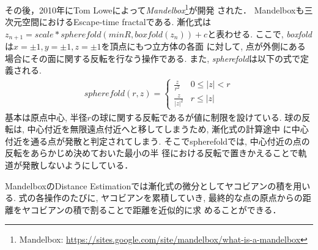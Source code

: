 その後，2010年にTom Loweによって{\it Mandelbox}\footnote{Mandelbox:
\url{https://sites.google.com/site/mandelbox/what-is-a-mandelbox}}が開発
された．
Mandelboxも三次元空間におけるEscape-time fractalである.
漸化式は$z_{n+1} = scale * spherefold(minR, boxfold(z_n)) + c$と表わせる.
ここで, {\it boxfold}は$x=\pm1, y=\pm1, z=\pm1$を頂点にもつ立方体の各面
に対して, 点が外側にある場合にその面に関する反転を行なう操作である.
また, {\it spherefold}は以下の式で定義される.
\begin{align*}
 spherefold(r, z) = \begin{cases}
                  \frac{z}{r^2} & 0 \le |z| < r \\
                  \frac{z}{|z|^2} & r \le |z|
                 \end{cases}
\end{align*}
基本は原点中心, 半径$r$の球に関する反転であるが値に制限を設けている.
球の反転は, 中心付近を無限遠点付近へと移してしまうため, 漸化式の計算途中
に中心付近を通る点が発散と判定されてしまう.
そこでspherefoldでは, 中心付近の点の反転をあらかじめ決めておいた最小の半
径における反転で置きかえることで軌道が発散しないようにしている．

MandelboxのDistance Estimationでは漸化式の微分としてヤコビアンの積を用いる.
式の各操作のたびに, ヤコビアンを累積していき,
最終的な点の原点からの距離をヤコビアンの積で割ることで距離を近似的に求
めることができる．

